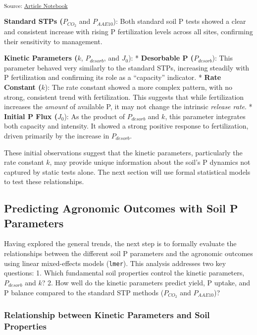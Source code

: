 \documentclass[
  a4paper,
]{article}
\begin{document}
\textsubscript{Source:
\href{https://Andrapodon.github.io/Master-Thesis-P-kinetics/index.qmd.html}{Article
Notebook}}

\textbf{Standard STPs (}\(P_{CO_2}\) and \(P_{AAE10}\)): Both standard
soil P tests showed a clear and consistent increase with rising P
fertilization levels across all sites, confirming their sensitivity to
management.

\textbf{Kinetic Parameters (}\(k\), \(P_{desorb}\), and \(J_0\)): *
\textbf{Desorbable P (}\(P_{desorb}\)): This parameter behaved very
similarly to the standard STPs, increasing steadily with P fertilization
and confirming its role as a ``capacity'' indicator. * \textbf{Rate
Constant (}\(k\)): The rate constant showed a more complex pattern, with
no strong, consistent trend with fertilization. This suggests that while
fertilization increases the \emph{amount} of available P, it may not
change the intrinsic \emph{release rate}. * \textbf{Initial P Flux
(}\(J_0\)): As the product of \(P_{desorb}\) and \(k\), this parameter
integrates both capacity and intensity. It showed a strong positive
response to fertilization, driven primarily by the increase in
\(P_{desorb}\).

These initial observations suggest that the kinetic parameters,
particularly the rate constant \(k\), may provide unique information
about the soil's P dynamics not captured by static tests alone. The next
section will use formal statistical models to test these relationships.

\subsection{Predicting Agronomic Outcomes with Soil P
Parameters}\label{predicting-agronomic-outcomes-with-soil-p-parameters}

Having explored the general trends, the next step is to formally
evaluate the relationships between the different soil P parameters and
the agronomic outcomes using linear mixed-effects models
(\texttt{lmer}). This analysis addresses two key questions: 1. Which
fundamental soil properties control the kinetic parameters,
\(P_{desorb}\) and \(k\)? 2. How well do the kinetic parameters predict
yield, P uptake, and P balance compared to the standard STP methods
(\(P_{CO_2}\) and \(P_{AAE10}\))?

\subsubsection{Relationship between Kinetic Parameters and Soil
Properties}\label{relationship-between-kinetic-parameters-and-soil-properties}
\end{document}
